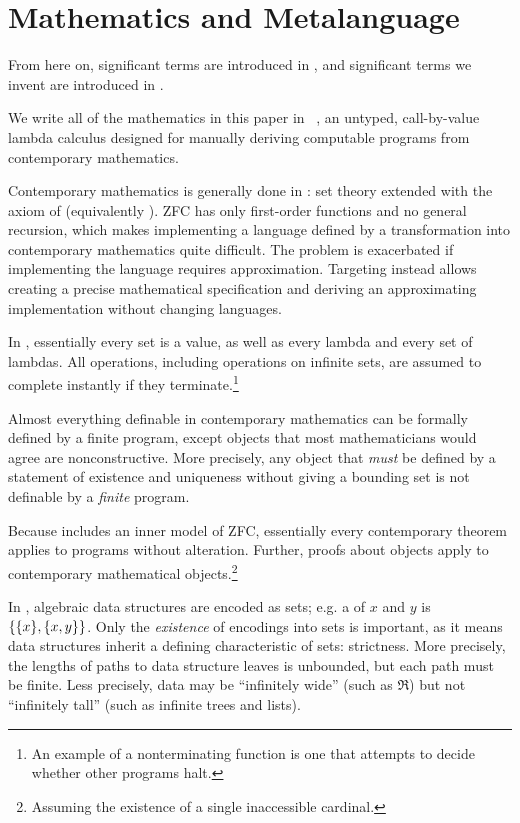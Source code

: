 \documentclass[preprint]{sigplanconf}
\begin{document}

\section{Mathematics and Metalanguage}

From here on, significant terms are introduced in , and significant terms we invent are introduced in .

We write all of the mathematics in this paper in \lzfclang~\cite{cit:toronto-2012flops-lzfc}, an untyped, call-by-value lambda calculus designed for manually deriving computable programs from contemporary mathematics.

Contemporary mathematics is generally done in :  set theory extended with the axiom of  (equivalently ).
ZFC has only first-order functions and no general recursion, which makes implementing a language defined by a transformation into contemporary mathematics quite difficult.
The problem is exacerbated if implementing the language requires approximation.
Targeting \lzfclang instead allows creating a precise mathematical specification and deriving an approximating implementation without changing languages.

In \lzfclang, essentially every set is a value, as well as every lambda and every set of lambdas.
All operations, including operations on infinite sets, are assumed to complete instantly if they terminate.\footnote{An
example of a nonterminating \lzfclang function is one that attempts to decide whether other \lzfclang programs halt.}

Almost everything definable in contemporary mathematics can be formally defined by a finite \lzfclang program, except objects that most mathematicians would agree are nonconstructive.
More precisely, any object that \emph{must} be defined by a statement of existence and uniqueness without giving a bounding set is not definable by a \emph{finite} \lzfclang program.

Because \lzfclang includes an inner model of ZFC, essentially every contemporary theorem applies to \lzfclang programs without alteration.
Further, proofs about \lzfclang objects apply to contemporary mathematical objects.\footnote{Assuming the existence of a single inaccessible cardinal.}

In \lzfclang, algebraic data structures are encoded as sets; e.g. a  of $x$ and $y$ is $\{{\{{x}\},\{{x,y}\}}\}$.
Only the \emph{existence} of encodings into sets is important, as it means data structures inherit a defining characteristic of sets: strictness.
More precisely, the lengths of paths to data structure leaves is unbounded, but each path must be finite.
Less precisely, data may be ``infinitely wide'' (such as $\Re$) but not ``infinitely tall'' (such as infinite trees and lists).
\end{document}
